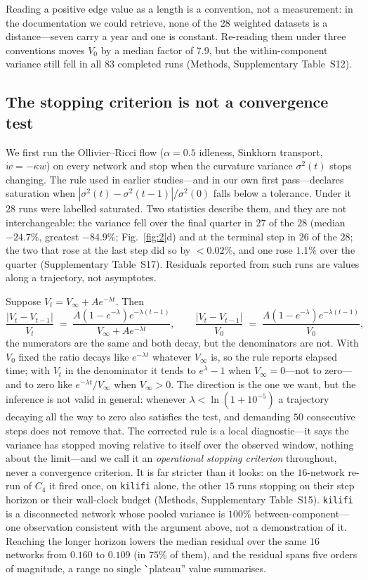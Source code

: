 \documentclass[11pt]{article}
\newcommand{\kappaedge}{\kappa}
\begin{document}
Reading a positive edge value as a length is a convention, not a measurement: in the documentation we could retrieve, none of the 28 weighted datasets is a distance---seven carry a year and one is constant. Re-reading them under three conventions moves $V_0$ by a median factor of 7.9, but the within-component variance still fell in all 83 completed runs (Methods, Supplementary Table~S12).

\subsection*{The stopping criterion is not a convergence test}

We first run the Ollivier--Ricci flow ($\alpha=0.5$ idleness, Sinkhorn
transport, $\dot w=-\kappaedge w$) on every network and stop when the
curvature variance $\sigma^2(t)$ stops changing. The rule used in earlier
studies---and in our own first pass---declares saturation when
$|\sigma^2(t)-\sigma^2(t-1)|/\sigma^2(0)$ falls below a tolerance. Under it
$28$ runs were labelled saturated. Two statistics describe them, and they
are not interchangeable: the variance fell over the final quarter in
$27$ of the $28$ (median $-24.7\%$, greatest $-84.9\%$; Fig.~\ref{fig:2}d) and
at the terminal step in $26$ of the $28$; the two that rose at the last step did
so by $<$$0.02\%$, and one rose $1.1\%$ over the quarter
(Supplementary Table~S17). Residuals reported from such runs are
values along a trajectory, not asymptotes.

Suppose $V_t=V_\infty+Ae^{-\lambda t}$. Then
\begin{equation}
  \frac{|V_t-V_{t-1}|}{V_t}\;=\;
  \frac{A(1-e^{-\lambda})e^{-\lambda (t-1)}}{V_\infty+Ae^{-\lambda t}},
  \qquad
  \frac{|V_t-V_{t-1}|}{V_0}\;=\;
  \frac{A(1-e^{-\lambda})e^{-\lambda (t-1)}}{V_0},
  \label{eq:stoprate}
\end{equation}
the numerators are the same and both decay, but the denominators are not.
With $V_0$ fixed the ratio decays like $e^{-\lambda t}$ whatever $V_\infty$ is,
so the rule reports elapsed time; with $V_t$ in the denominator it tends to
$e^{\lambda}-1$ when $V_\infty=0$---not to zero---and to zero like
$e^{-\lambda t}/V_\infty$ when $V_\infty>0$. The direction is the one we want, but the
inference is not valid in general: whenever $\lambda<\ln(1+10^{-5})$ a
trajectory decaying all the way to zero also satisfies the test, and demanding
$50$ consecutive steps does not remove that.
The corrected rule is a local diagnostic---it says the variance has stopped
moving relative to itself over the observed window, nothing about the
limit---and we call it an \emph{operational stopping criterion} throughout,
never a convergence criterion. It is far
stricter than it looks: on the $16$-network re-run of $C_4$ it fired once, on
\texttt{kilifi} alone, the other $15$ runs stopping on their step horizon or
their wall-clock budget (Methods, Supplementary Table~S15). \texttt{kilifi} is a
disconnected network whose pooled variance is $100\%$
between-component---one observation consistent with the argument above, not a
demonstration of it. Reaching the longer horizon lowers the median residual over
the same $16$ networks from $0.160$ to $0.109$ (in $75\%$ of them), and the
residual spans five orders of magnitude, a range no single \``plateau'' value
summarises.
\end{document}
